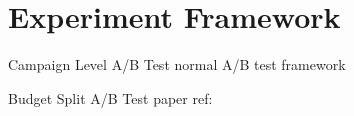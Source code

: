 \documentclass[../main.tex]{subfiles}
\begin{document}
	\chapter{Experiment Framework}
	

	\begin{section}{Campaign Level A/B Test}
		normal A/B test framework
	\end{section}
	
	\begin{section} {Budget Split A/B Test}
		paper ref: \cite{Nisan2007-gr}
	\end{section}
	
\end{document}
